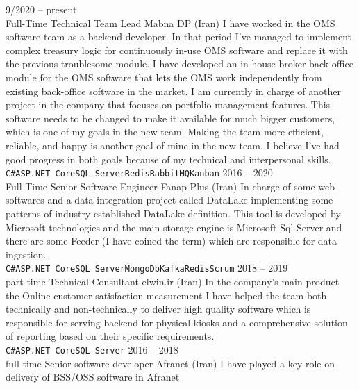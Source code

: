 \documentclass[9pt]{developercv} %
\begin{document}
\begin{entrylist}
	\entry
		{9/2020 -- present\\\footnotesize{Full-Time}}
		{Technical Team Lead}
		{Mabna DP (Iran)}
		{I have worked in the OMS software team as a backend developer. In that period I've managed to implement complex treasury logic for continuously in-use OMS software and replace it with the previous troublesome module. I have developed an in-house broker back-office module for the OMS software that lets the OMS work independently from existing back-office software in the market. I am currently in charge of another project in the company that focuses on portfolio management features. This software needs to be changed to make it available for much bigger customers, which is one of my goals in the new team. Making the team more efficient, reliable, and happy is another goal of mine in the new team. I believe I've had good progress in both goals because of my technical and interpersonal skills. \\ \texttt{C\#}\slashsep\texttt{ASP.NET Core}\slashsep\texttt{SQL Server}\slashsep\texttt{Redis}\slashsep\texttt{RabbitMQ}\slashsep\texttt{Kanban}}
	\entry
		{2016 -- 2020\\\footnotesize{Full-Time}}
		{Senior Software Engineer}
		{Fanap Plus (Iran)}
		{In charge of some web softwares and a data integration project called DataLake implementing some patterns of industry
established DataLake definition. This tool is developed by Microsoft technologies
and the main storage engine is Microsoft Sql Server and there are some Feeder (I have coined the term) which are responsible for data ingestion.\\ \texttt{C\#}\slashsep\texttt{ASP.NET Core}\slashsep\texttt{SQL Server}\slashsep\texttt{MongoDb}\slashsep\texttt{Kafka}\slashsep\texttt{Redis}\slashsep\texttt{Scrum}}
	\entry
		{2018 -- 2019\\\footnotesize{part time}}
		{Technical Consultant}
		{elwin.ir (Iran)}
		{In the company’s main product the
Online customer satisfaction measurement I have helped the team both technically and non-technically to deliver high quality software which is
responsible for
serving backend for physical kiosks and a comprehensive solution of reporting based on their specific
requirements.\\ \texttt{C\#}\slashsep\texttt{ASP.NET Core}\slashsep\texttt{SQL Server}}
	\entry
		{2016 -- 2018\\\footnotesize{full time}}
		{Senior software developer}
		{Afranet (Iran)}
		{I have played a key role on delivery of BSS/OSS software in Afranet
}
\end{entrylist}
\end{document}
